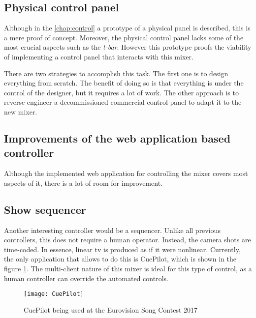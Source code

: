 \documentclass[../main.tex]{subfiles}
\begin{document}
\subsection{Physical control panel}
Although in the \autoref{chap:control} a prototype of a physical panel is described, this is a mere proof of concept. Moreover, the physical control panel lacks some of the most crucial aspects such as the \textit{t-bar}. However this prototype proofs the viability of implementing a control panel that interacts with this mixer.\newline

There are two strategies to accomplish this task. The first one is to design everything from scratch. The benefit of doing so is that everything is under the control of the designer, but it requires a lot of work. The other approach is to reverse engineer a decommissioned commercial control panel to adapt it to the new mixer.\newline

\subsection{Improvements of the web application based controller}
Although the implemented web application for controlling the mixer covers most aspects of it, there is a lot of room for improvement. 

\subsection{Show sequencer}
Another interesting controller would be a sequencer. Unlike all previous controllers, this does not require a human operator. Instead, the camera shots are time-coded. In essence, linear \gls{tv} is produced as if it were nonlinear. Currently, the only application that allows to do this is CuePilot, which is shown in the figure \ref{fig:07:cuepilot}. The multi-client nature of this mixer is ideal for this type of control, as a human controller can override the automated controls.

\begin{figure}[htbp]
    \centering
    \texttt{[image: CuePilot]}
    \caption{CuePilot being used at the Eurovision Song Contest 2017}
    \label{fig:07:cuepilot}
\end{figure}

\end{document}
